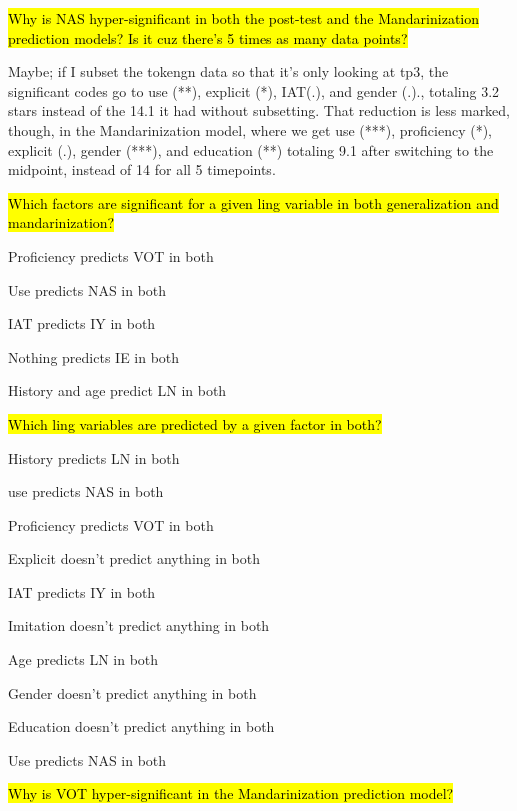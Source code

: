 
\hl{Why is NAS hyper-significant in both the post-test and the Mandarinization prediction models? Is it cuz there's 5 times as many data points?}

Maybe; if I subset the tokengn data so that it's only looking at tp3, the significant codes go to use (**), explicit (*), IAT(.), and gender (.)., totaling 3.2 stars instead of the 14.1 it had without subsetting. That reduction is less marked, though, in the Mandarinization model, where we get use (***), proficiency (*), explicit (.), gender (***), and education (**) totaling 9.1 after switching to the midpoint, instead of 14 for all 5 timepoints.

\hl{Which factors are significant for a given ling variable in both generalization and mandarinization?}

Proficiency predicts VOT in both

Use predicts NAS in both

IAT predicts IY in both

Nothing predicts IE in both

History and age predict LN in both

\hl{Which ling variables are predicted by a given factor in both?}

History predicts LN in both

use predicts NAS in both

Proficiency predicts VOT in both

Explicit doesn't predict anything in both

IAT predicts IY in both

Imitation doesn't predict anything in both

Age predicts LN in both

Gender doesn't predict anything in both

Education doesn't predict anything in both

Use predicts NAS in both

\hl{Why is VOT hyper-significant in the Mandarinization prediction model?}

